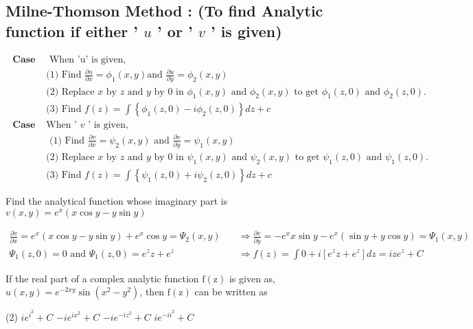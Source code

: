 	\subsection{Milne-Thomson Method : (To find Analytic function if either ' $u$ ' or ' $v$ ' is given)}
	\begin{align*}
\textbf{	Case 1:}&\text{ When 'u' is given,}\\
	&\text{(1) Find }\frac{\partial u}{\partial x}=\phi_{1}(x, y) \text{and }\frac{\partial u}{\partial y}=\phi_{2}(x, y)\\
	&\text{(2) Replace }\text{$x$ by $z$ and $y$ by 0 in $\phi_{1}(x, y)$ and $\phi_{2}(x, y)$ to get $\phi_{1}(z, 0)$ and $\phi_{2}(z, 0)$.}\\
	&\text{(3) Find }f(z)=\int\left\{\phi_{1}(z, 0)-i \phi_{2}(z, 0)\right\} d z+c\\
\textbf{	Case 2: }&\text{When ' $v$ ' is given,}\\
&\text{	(1) Find }\frac{\partial v}{\partial x}=\psi_{2}(x, y)\text{ and }\frac{\partial v}{\partial y}=\psi_{1}(x, y)\\
&\text{(2) Replace }\text{$x$ by $z$ and $y$ by 0 in $\psi_{1}(x, y)$ and $\psi_{2}(x, y)$ to get $\psi_{1}(z, 0)$ and $\psi_{1}(z, 0)$.}\\
&\text{(3) Find }f(z)=\int\left\{\psi_{1}(z, 0)+i \psi_{2}(z, 0)\right\} d z+c
	\end{align*}
	\begin{exercise}
		Find the analytical function whose imaginary part is $v(x, y)=e^{x}(x \cos y-y \sin y)$
	\end{exercise}
	\begin{answer}
		\begin{align*}
		\frac{\partial v}{\partial x}=e^{x}(x \cos y-y \sin y)+e^{x} \cos y=\Psi_{2}(x, y) \quad& \Rightarrow \frac{\partial v}{\partial y}=-e^{x} x \sin y-e^{x}(\sin y+y \cos y)=\Psi_{1}(x, y) \\
		\Psi_{1}(z, 0)=0 \text { and } \Psi_{1}(z, 0)=e^{z} z+e^{z} \quad& \Rightarrow f(z)=\int 0+i\left[e^{z} z+e^{z}\right] d z=i z e^{z}+C
		\end{align*}
	\end{answer}
	\begin{exercise}
		 If the real part of a complex analytic function $\mathrm{f}(\mathrm{z})$ is given as, $u(x, y)=e^{-2 x y} \sin \left(x^{2}-y^{2}\right)$, then $\mathrm{f}(\mathrm{z})$ can be written as
		 \begin{tasks}(2)
			\task[\textbf{a.}]$i e^{i^{2}}+C$
			\task[\textbf{b.}] $-i e^{i x^{2}}+C$
			\task[\textbf{c.}] $-i e^{-i z^{2}}+C$
			\task[\textbf{d.}] $i e^{-i i^{2}}+C$
		\end{tasks}
	\end{exercise}

